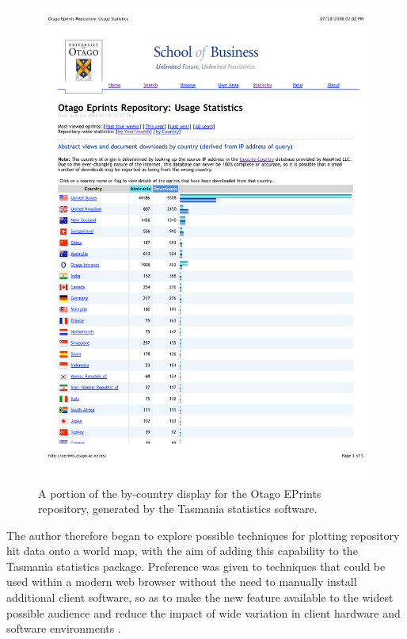 \documentclass[acmnow]{acmtrans2m}
\begin{document}
\begin{figure}
	\centering
	\includegraphics[scale=0.65]{tasmania_stats}
	\caption{A portion of the by-country display for the Otago EPrints
	repository, generated by the Tasmania statistics software.}
	\label{fig-tas-stats}
\end{figure}


The author therefore began to explore possible techniques for plotting
repository hit data onto a world map, with the aim of adding this
capability to the Tasmania statistics package. Preference was given to
techniques that could be used within a modern web browser without the
need to manually install additional client software, so as to make the
new feature available to the widest possible audience and reduce the
impact of wide variation in client hardware and software environments
\cite[pp.\ 27--28]{Offu-J-2002-quality}.
\end{document}
